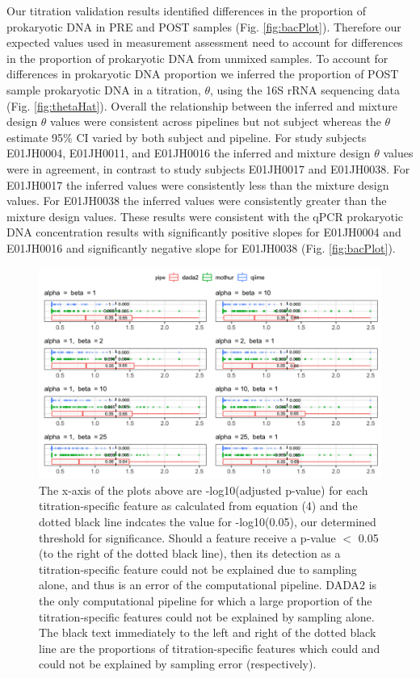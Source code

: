 \documentclass[12pt]{article}
\begin{document}
Our titration validation results identified differences in the
proportion of prokaryotic DNA in PRE and POST samples (Fig. \ref{fig:bacPlot}).
Therefore our expected values used in measurement assessment need to account
for differences in the proportion of prokaryotic DNA from unmixed samples.
To account for differences in prokaryotic DNA proportion we inferred
the proportion of POST sample prokaryotic DNA in a titration, \(\theta\), using
the 16S rRNA sequencing data (Fig. \ref{fig:thetaHat}). Overall the relationship
between the inferred and mixture design \(\theta\) values were
consistent across pipelines but not subject whereas the \(\theta\)
estimate 95\% CI varied by both subject and pipeline. For study subjects
E01JH0004, E01JH0011, and E01JH0016 the inferred and mixture design
\(\theta\) values were in agreement, in contrast to study subjects
E01JH0017 and E01JH0038. For E01JH0017 the inferred values were
consistently less than the mixture design values. For E01JH0038
the inferred values were consistently greater than the mixture design
values. These results were consistent with the qPCR prokaryotic DNA
concentration results with significantly positive slopes for E01JH0004
and E01JH0016 and significantly negative slope for E01JH0038 (Fig.
\ref{fig:bacPlot}).

\clearpage

\begin{figure}
\centering
\includegraphics[width=0.9\linewidth]{bayes_beta.png}
\caption{\label{fig:bayesPrior} The x-axis of the plots above are -log10(adjusted p-value) for each titration-specific feature as calculated from equation (4) and the dotted black line indcates the value for -log10(0.05), our determined threshold for significance. Should a feature receive a p-value $<$ 0.05 (to the right of the dotted black line), then its detection as a titration-specific feature could not be explained due to sampling alone, and thus is an error of the computational pipeline. DADA2 is the only computational pipeline for which a large proportion of the titration-specific features could not be explained by sampling alone. The black text immediately to the left and right of the dotted black line are the proportions of titration-specific features which could and could not be explained by sampling error (respectively).}
\end{figure}
\end{document}
